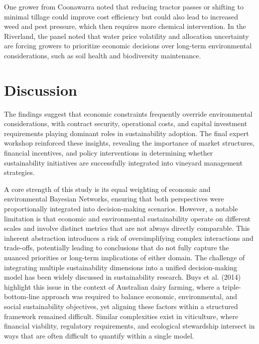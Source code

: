 \documentclass{article}
\begin{document}
One grower from Coonawarra noted that reducing tractor passes or shifting to minimal tillage could improve cost efficiency but could also lead to increased weed and pest pressure, which then requires more chemical intervention.
In the Riverland, the panel noted that water price volatility and allocation uncertainty are forcing growers to prioritize economic decisions over long-term environmental considerations, such as soil health and biodiversity maintenance.

\section{Discussion}


The findings suggest that economic constraints frequently override environmental considerations, with contract security, operational costs, and capital investment requirements playing dominant roles in sustainability adoption. The final expert workshop reinforced these insights, revealing the importance of market structures, financial incentives, and policy interventions in determining whether sustainability initiatives are successfully integrated into vineyard management strategies.

A core strength of this study is its equal weighting of economic and environmental Bayesian Networks, ensuring that both perspectives were proportionally integrated into decision-making scenarios. However, a notable limitation is that economic and environmental sustainability operate on different scales and involve distinct metrics that are not always directly comparable. This inherent abstraction introduces a risk of oversimplifying complex interactions and trade-offs, potentially leading to conclusions that do not fully capture the nuanced priorities or long-term implications of either domain. The challenge of integrating multiple sustainability dimensions into a unified decision-making model has been widely discussed in sustainability research. Buys et al. (2014) highlight this issue in the context of Australian dairy farming, where a triple-bottom-line approach was required to balance economic, environmental, and social sustainability objectives, yet aligning these factors within a structured framework remained difficult. Similar complexities exist in viticulture, where financial viability, regulatory requirements, and ecological stewardship intersect in ways that are often difficult to quantify within a single model.
\end{document}
